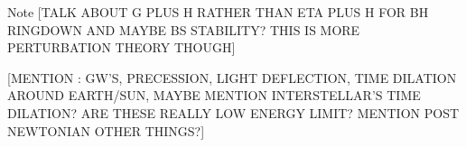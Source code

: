 Note [TALK ABOUT G PLUS H RATHER THAN ETA PLUS H FOR BH RINGDOWN AND MAYBE BS STABILITY? THIS IS MORE PERTURBATION THEORY THOUGH]




[MENTION : GW'S, PRECESSION, LIGHT DEFLECTION, TIME DILATION AROUND EARTH/SUN, MAYBE MENTION INTERSTELLAR'S TIME DILATION? ARE THESE REALLY LOW ENERGY LIMIT? MENTION POST NEWTONIAN OTHER THINGS?]




